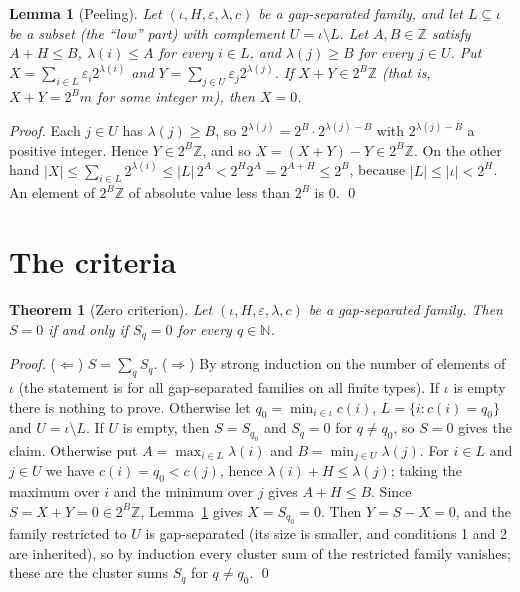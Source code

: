 \documentclass[11pt]{article}
\newtheorem{theorem}{Theorem}
\newtheorem{lemma}{Lemma}
\newcommand{\Z}{\mathbb Z}\newcommand{\Q}{\mathbb Q}\newcommand{\N}{\mathbb N}
\begin{document}
\begin{lemma}[Peeling]\label{lem:peel}
Let $(\iota,H,\varepsilon,\lambda,c)$ be a gap-separated family, and let $L\subseteq\iota$ be a subset (the ``low'' part) with complement $U=\iota\setminus L$. Let $A,B\in\Z$ satisfy $A+H\le B$, $\lambda(i)\le A$ for every $i\in L$, and $\lambda(j)\ge B$ for every $j\in U$. Put $X=\sum_{i\in L}\varepsilon_i2^{\lambda(i)}$ and $Y=\sum_{j\in U}\varepsilon_j2^{\lambda(j)}$. If $X+Y\in2^{B}\Z$ (that is, $X+Y=2^{B}m$ for some integer $m$), then $X=0$.
\end{lemma}
\begin{proof}
Each $j\in U$ has $\lambda(j)\ge B$, so $2^{\lambda(j)}=2^{B}\cdot2^{\lambda(j)-B}$ with $2^{\lambda(j)-B}$ a positive integer. Hence $Y\in2^{B}\Z$, and so $X=(X+Y)-Y\in2^{B}\Z$. On the other hand $|X|\le\sum_{i\in L}2^{\lambda(i)}\le|L|\,2^{A}<2^{H}2^{A}=2^{A+H}\le2^{B}$, because $|L|\le|\iota|<2^{H}$. An element of $2^{B}\Z$ of absolute value less than $2^{B}$ is $0$. \qed
\end{proof}

\section{The criteria}

\begin{theorem}[Zero criterion]\label{thm:zero}
Let $(\iota,H,\varepsilon,\lambda,c)$ be a gap-separated family. Then $S=0$ if and only if $S_q=0$ for every $q\in\N$.
\end{theorem}
\begin{proof}
($\Leftarrow$) $S=\sum_qS_q$. ($\Rightarrow$) By strong induction on the number of elements of $\iota$ (the statement is for all gap-separated families on all finite types). If $\iota$ is empty there is nothing to prove. Otherwise let $q_0=\min_{i\in\iota}c(i)$, $L=\{i:c(i)=q_0\}$ and $U=\iota\setminus L$. If $U$ is empty, then $S=S_{q_0}$ and $S_q=0$ for $q\ne q_0$, so $S=0$ gives the claim. Otherwise put $A=\max_{i\in L}\lambda(i)$ and $B=\min_{j\in U}\lambda(j)$. For $i\in L$ and $j\in U$ we have $c(i)=q_0<c(j)$, hence $\lambda(i)+H\le\lambda(j)$; taking the maximum over $i$ and the minimum over $j$ gives $A+H\le B$. Since $S=X+Y=0\in2^{B}\Z$, Lemma~\ref{lem:peel} gives $X=S_{q_0}=0$. Then $Y=S-X=0$, and the family restricted to $U$ is gap-separated (its size is smaller, and conditions 1 and 2 are inherited), so by induction every cluster sum of the restricted family vanishes; these are the cluster sums $S_q$ for $q\ne q_0$. \qed
\end{proof}
\end{document}
